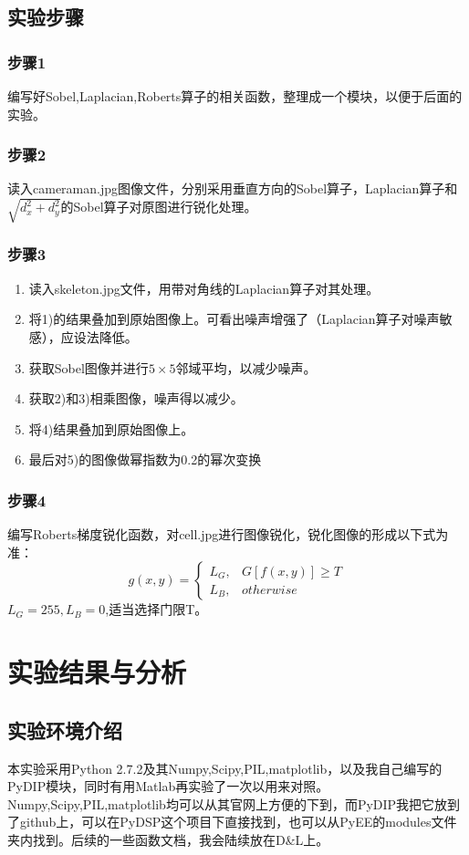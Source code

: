 \documentclass[]{IEEEphot}
\begin{document}
\subsection{实验步骤}
\subsubsection{步骤1}
编写好Sobel,Laplacian,Roberts算子的相关函数，整理成一个模块，以便于后面的实验。
\subsubsection{步骤2}
读入cameraman.jpg图像文件，分别采用垂直方向的Sobel算子，Laplacian算子和$\sqrt{d_x^2+d_y^2}$的Sobel算子对原图进行锐化处理。
\subsubsection{步骤3}
\begin{enumerate}
	\item 读入skeleton.jpg文件，用带对角线的Laplacian算子对其处理。
	\item 将1)的结果叠加到原始图像上。可看出噪声增强了（Laplacian算子对噪声敏感），应设法降低。
	\item 获取Sobel图像并进行$5\times5$邻域平均，以减少噪声。
	\item 获取2)和3)相乘图像，噪声得以减少。
	\item 将4)结果叠加到原始图像上。
	\item 最后对5)的图像做幂指数为0.2的幂次变换
\end{enumerate}
\subsubsection{步骤4}
编写Roberts梯度锐化函数，对cell.jpg进行图像锐化，锐化图像的形成以下式为准：
\begin{equation}
	g(x,y)=
	\left\{
		\begin{array}{lr}
			L_G, & G[f(x,y)]\geq T\\
			L_B, & otherwise
		\end{array}
	\right.
\end{equation}
$L_G=255,L_B=0$,适当选择门限T。
\section{实验结果与分析}
\subsection{实验环境介绍}
本实验采用Python 2.7.2及其Numpy,Scipy,PIL,matplotlib，以及我自己编写的PyDIP模块，同时有用Matlab再实验了一次以用来对照。
Numpy,Scipy,PIL,matplotlib均可以从其官网上方便的下到，而PyDIP我把它放到了github上，可以在PyDSP这个项目下直接找到，也可以从PyEE的modules文件夹内找到。后续的一些函数文档，我会陆续放在D\&L上。
\end{document}
